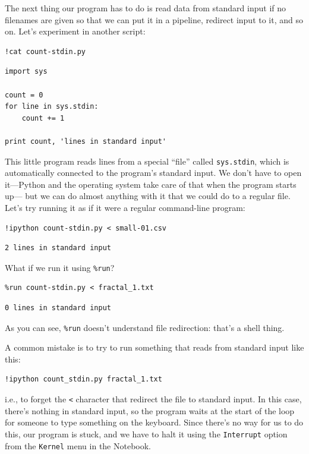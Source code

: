 \documentclass{book}
\begin{document}
The next thing our program has to do is read data from standard input if
no filenames are given so that we can put it in a pipeline, redirect
input to it, and so on. Let's experiment in another script:

\begin{verbatim}
!cat count-stdin.py
\end{verbatim}

\begin{verbatim}
import sys

count = 0
for line in sys.stdin:
    count += 1

print count, 'lines in standard input'
\end{verbatim}

This little program reads lines from a special ``file'' called
\texttt{sys.stdin}, which is automatically connected to the program's
standard input. We don't have to open it---Python and the operating
system take care of that when the program starts up--- but we can do
almost anything with it that we could do to a regular file. Let's try
running it as if it were a regular command-line program:

\begin{verbatim}
!ipython count-stdin.py < small-01.csv
\end{verbatim}

\begin{verbatim}
2 lines in standard input
\end{verbatim}

What if we run it using \texttt{\%run}?

\begin{verbatim}
%run count-stdin.py < fractal_1.txt
\end{verbatim}

\begin{verbatim}
0 lines in standard input
\end{verbatim}

As you can see, \texttt{\%run} doesn't understand file redirection:
that's a shell thing.

A common mistake is to try to run something that reads from standard
input like this:

\begin{verbatim}
!ipython count_stdin.py fractal_1.txt
\end{verbatim}

i.e., to forget the \texttt{\textless{}} character that redirect the
file to standard input. In this case, there's nothing in standard input,
so the program waits at the start of the loop for someone to type
something on the keyboard. Since there's no way for us to do this, our
program is stuck, and we have to halt it using the \texttt{Interrupt}
option from the \texttt{Kernel} menu in the Notebook.
\end{document}
